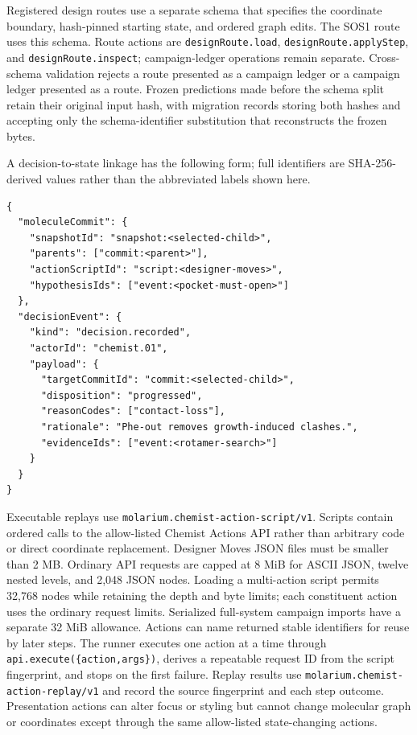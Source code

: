 \documentclass[11pt]{article}
\begin{document}
\begin{small}
Registered design routes use a separate  schema that specifies the coordinate boundary, hash-pinned starting state, and ordered graph edits. The SOS1 route uses this schema. Route actions are \texttt{designRoute.load}, \texttt{designRoute.applyStep}, and \texttt{designRoute.inspect}; campaign-ledger operations remain separate. Cross-schema validation rejects a route presented as a campaign ledger or a campaign ledger presented as a route. Frozen predictions made before the schema split retain their original input hash, with migration records storing both hashes and accepting only the schema-identifier substitution that reconstructs the frozen bytes.

A decision-to-state linkage has the following form; full identifiers are SHA-256-derived values rather than the abbreviated labels shown here.

\begin{lstlisting}
{
  "moleculeCommit": {
    "snapshotId": "snapshot:<selected-child>",
    "parents": ["commit:<parent>"],
    "actionScriptId": "script:<designer-moves>",
    "hypothesisIds": ["event:<pocket-must-open>"]
  },
  "decisionEvent": {
    "kind": "decision.recorded",
    "actorId": "chemist.01",
    "payload": {
      "targetCommitId": "commit:<selected-child>",
      "disposition": "progressed",
      "reasonCodes": ["contact-loss"],
      "rationale": "Phe-out removes growth-induced clashes.",
      "evidenceIds": ["event:<rotamer-search>"]
    }
  }
}
\end{lstlisting}

Executable replays use \texttt{molarium.chemist-action-script/v1}. Scripts contain ordered calls to the allow-listed Chemist Actions API rather than arbitrary code or direct coordinate replacement. Designer Moves JSON files must be smaller than 2 MB. Ordinary API requests are capped at 8 MiB for ASCII JSON, twelve nested levels, and 2,048 JSON nodes. Loading a multi-action script permits 32,768 nodes while retaining the depth and byte limits; each constituent action uses the ordinary request limits. Serialized full-system campaign imports have a separate 32 MiB allowance. Actions can name returned stable identifiers for reuse by later steps. The runner executes one action at a time through \texttt{api.execute(\{action,args\})}, derives a repeatable request ID from the script fingerprint, and stops on the first failure. Replay results use \texttt{molarium.chemist-action-replay/v1} and record the source fingerprint and each step outcome. Presentation actions can alter focus or styling but cannot change molecular graph or coordinates except through the same allow-listed state-changing actions.


\end{small}
\end{document}
